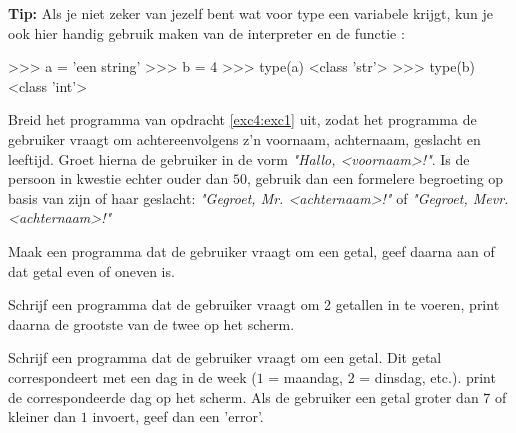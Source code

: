 \begin{remark}
\textbf{Tip:} Als je niet zeker van jezelf bent wat voor type een variabele krijgt, kun je ook hier handig gebruik maken van de interpreter en de functie :
\begin{python}
>>> a = 'een string'
>>> b = 4
>>> type(a)
<class 'str'>
>>> type(b)
<class 'int'>
\end{python}
\end{remark}

\begin{exercise}
Breid het programma van opdracht \ref{exc4:exc1} uit, zodat het programma de gebruiker vraagt om achtereenvolgens z'n voornaam, achternaam, geslacht en leeftijd. \newline
Groet hierna de gebruiker in de vorm \textit{"Hallo, <voornaam>!"}. \newline
Is de persoon in kwestie echter ouder dan $50$, gebruik dan een formelere begroeting op basis van zijn of haar geslacht: \textit{"Gegroet, Mr. <achternaam>!"} of \textit{"Gegroet, Mevr. <achternaam>!"}
\end{exercise}

\begin{exercise}
Maak een programma dat de gebruiker vraagt om een getal, geef daarna aan of dat getal even of oneven is.
\end{exercise}

\begin{exercise}
Schrijf een programma dat de gebruiker vraagt om 2 getallen in te voeren, print daarna de grootste van de twee op het scherm. 
\end{exercise}

\begin{exercise}
Schrijf een programma dat de gebruiker vraagt om een getal. Dit getal correspondeert met een dag in de week ($1$ = maandag, $2$ = dinsdag, etc.). print de correspondeerde dag op het scherm. Als de gebruiker een getal groter dan $7$ of kleiner dan $1$ invoert, geef dan een 'error'.
\end{exercise}

